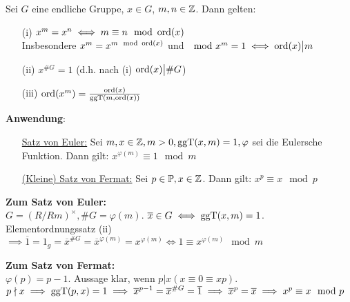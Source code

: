 \documentclass[a4paper,twoside,DIV15,BCOR12mm]{scrbook}
\begin{document}
\begin{satz}[Elementordnungssatz]
    Sei $G$ eine endliche Gruppe, $x \in G$, $m, n \in \mathbb{Z}$. Dann gelten:
    \begin{itemize}
        \item[(i)] $x^m = x^n \iff m \equiv n \mod {\mathop{\rm ord}\nolimits}(x)$\\
        Insbesondere $x^m = x^{m \mod {\mathop{\rm ord}\nolimits}(x)}$ und $\mod x^m = 1 \iff \mathop{\rm ord}\nolimits(x) \big| m$
        \item[(ii)] $x^{\# G} = 1$ (d.h. nach (i) $\mathop{\rm ord}\nolimits(x) \big| \# G$)
        \item[(iii)] $\mathop{\rm ord}\nolimits(x^m) = \frac{\mathop{\rm ord}\nolimits(x)}{\mathop{\rm ggT}\nolimits (m, \mathop{\rm ord}\nolimits(x))}$
    \end{itemize}
\end{satz}

\textbf{Anwendung}:
\begin{itemize}
    \item[] \underline{Satz von Euler:} Sei $m, x \in \mathbb{Z}, m > 0, \mathop{\rm ggT}\nolimits (x,m) = 1, \varphi$ sei die Eulersche Funktion. Dann gilt: $x^{\varphi(m)} \equiv 1 \mod m$
    \item[] \underline{(Kleine) Satz von Fermat:} Sei $p \in \mathbb{P}, x \in \mathbb{Z}$. Dann gilt: $x^p \equiv x \mod p$
\end{itemize}

\textbf{Zum Satz von Euler:}\\
$G = (R/Rm)^\times, \# G = \varphi(m)$. $\overline x \in G \iff
\mathop{\rm ggT}\nolimits(x,m) = 1$. Elementordnungssatz (ii) $\implies \overline 1 = 1_g
= \overline x^{\# G} = \overline x^{\varphi(m)} = x^{\varphi(m)}
\iff 1 \equiv x^{\varphi(m)} \mod m$

\textbf{Zum Satz von Fermat:}\\
$\varphi(p) = p-1$. Aussage klar, wenn $p \big| x (x \equiv 0 \equiv
xp)$. $p \nmid x \implies \mathop{\rm ggT}\nolimits(p,x) = 1 \implies \overline x^{p-1} =
\overline x^{\# G} = \overline 1 \implies \overline x^p = \overline
x \implies x^p \equiv x \mod p$
\end{document}
